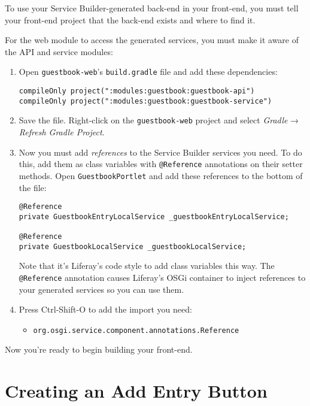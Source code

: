 To use your Service Builder-generated back-end in your front-end, you
must tell your front-end project that the back-end exists and where to
find it.

For the web module to access the generated services, you must make it
aware of the API and service modules:

\begin{enumerate}
\def\labelenumi{\arabic{enumi}.}
\item
  Open \texttt{guestbook-web}'s \texttt{build.gradle} file and add these
  dependencies:

\begin{verbatim}
compileOnly project(":modules:guestbook:guestbook-api")
compileOnly project(":modules:guestbook:guestbook-service")
\end{verbatim}
\item
  Save the file. Right-click on the \texttt{guestbook-web} project and
  select \emph{Gradle} → \emph{Refresh Gradle Project}.
\item
  Now you must add \emph{references} to the Service Builder services you
  need. To do this, add them as class variables with \texttt{@Reference}
  annotations on their setter methods. Open \texttt{GuestbookPortlet}
  and add these references to the bottom of the file:

\begin{verbatim}
@Reference
private GuestbookEntryLocalService _guestbookEntryLocalService;

@Reference
private GuestbookLocalService _guestbookLocalService;
\end{verbatim}

  Note that it's Liferay's code style to add class variables this way.
  The \texttt{@Reference} annotation causes Liferay's OSGi container to
  inject references to your generated services so you can use them.
\item
  Press Ctrl-Shift-O to add the import you need:

  \begin{itemize}
  \tightlist
  \item
    \texttt{org.osgi.service.component.annotations.Reference}
  \end{itemize}
\end{enumerate}

Now you're ready to begin building your front-end.

\chapter{Creating an Add Entry
Button}\label{creating-an-add-entry-button}

